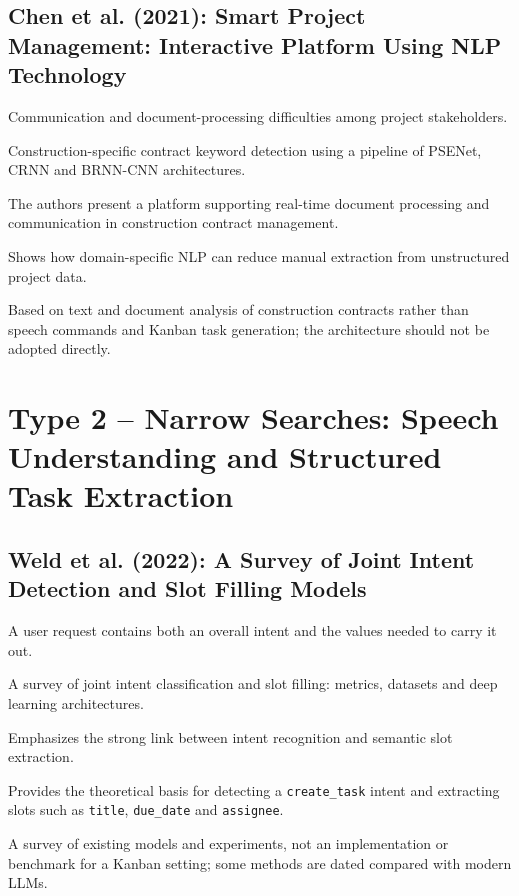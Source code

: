 \documentclass[11pt,a4paper]{article}
\newenvironment{sourceinfo}{\begin{description}[leftmargin=0pt,labelsep=0.5em,font=\normalfont\bfseries]}{\end{description}}
\newcommand{\source}[2]{\subsection{\texorpdfstring{#1~\cite{#2}}{#1}}}
\begin{document}
\source{Chen et al. (2021): Smart Project Management: Interactive Platform Using NLP Technology}{chen2021smart}
\begin{sourceinfo}
  \item[Problem.] Communication and document-processing difficulties among project stakeholders.
  \item[Method.] Construction-specific contract keyword detection using a pipeline of PSENet, CRNN and BRNN-CNN architectures.
  \item[Reported findings.] The authors present a platform supporting real-time document processing and communication in construction contract management.
  \item[Relevance.] Shows how domain-specific NLP can reduce manual extraction from unstructured project data.
  \item[Limitation for our project.] Based on text and document analysis of construction contracts rather than speech commands and Kanban task generation; the architecture should not be adopted directly.
\end{sourceinfo}

\section{Type 2 -- Narrow Searches: Speech Understanding and Structured Task Extraction}

\source{Weld et al. (2022): A Survey of Joint Intent Detection and Slot Filling Models}{weld2022survey}
\begin{sourceinfo}
  \item[Problem.] A user request contains both an overall intent and the values needed to carry it out.
  \item[Approach.] A survey of joint intent classification and slot filling: metrics, datasets and deep learning architectures.
  \item[Findings.] Emphasizes the strong link between intent recognition and semantic slot extraction.
  \item[Relevance.] Provides the theoretical basis for detecting a \texttt{create\_task} intent and extracting slots such as \texttt{title}, \texttt{due\_date} and \texttt{assignee}.
  \item[Limitation.] A survey of existing models and experiments, not an implementation or benchmark for a Kanban setting; some methods are dated compared with modern LLMs.
\end{sourceinfo}
\end{document}
